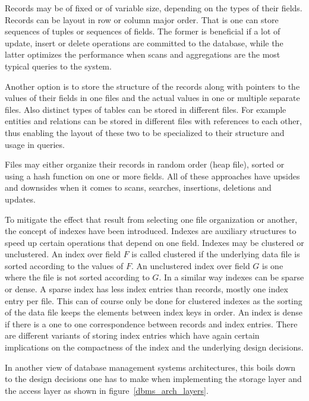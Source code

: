 \documentclass[a4paper,10pt]{article}
\begin{document}
Records may be of fixed or of variable size, depending on the types of their fields. Records can be layout in row or column major order. That is one can store sequences of tuples or sequences of fields. The former is beneficial if a lot of update, insert or delete operations are committed to the database, while the latter optimizes the performance when scans and aggregations are the most typical queries to the system.

Another option is to store the structure of the records along with pointers to the values of their fields in one files and the actual values in one or multiple separate files. Also distinct types of tables can be stored in different files. For example entities and relations can be stored in different files with references to each other, thus enabling the layout of these two to be specialized to their structure and usage in queries.

Files may either organize their records in random order (heap file), sorted or using a hash function on one or more fields. All of these approaches have upsides and downsides when it comes to scans, searches, insertions, deletions and updates. 

To mitigate the effect that result from selecting one file organization or another, the concept of indexes have been introduced. Indexes are auxiliary structures to speed up certain operations that depend on one field. Indexes may be clustered or unclustered. An index over field $F$ is called clustered if the underlying data file is sorted according to the values of $F$. An unclustered index over field $G$ is one where the file is not sorted according to $G$. In a similar way indexes can be sparse or dense. A sparse index has less index entries than records, mostly one index entry per file. This can of course only be done for clustered indexes as the sorting of the data file keeps the elements between index keys in order. An index is dense if there is a one to one correspondence between records and index entries. There are different variants of storing index entries which have again certain implications on the compactness of the index and the underlying design decisions.

In another view of database management systems architectures, this boils down to the design decisions one has to make when implementing the storage layer and the access layer as shown in figure~\ref{dbms_arch_layers}.
\end{document}
